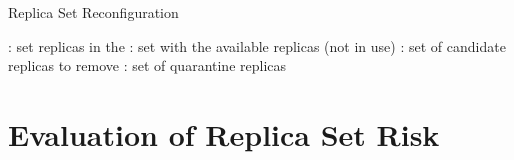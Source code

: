 {\centering
\begin{minipage}{.7\linewidth}
  \begin{algorithm}[H]
\caption{Replica Set Reconfiguration}\label{alg:algorithm2}
{\footnotesize
\ES: set replicas in the \configuration \;
\RS: set with the available replicas (not in use)\;
\MAX: set of candidate replicas to remove\;
\QS: set of quarantine replicas\;

\BlankLine
{}
}
\end{algorithm}

\end{minipage}
\par
}


\section{Evaluation of Replica Set Risk}
\label{sec:diversity}

